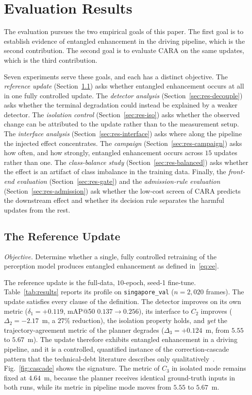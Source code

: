 \documentclass[conference]{IEEEtran}
\begin{document}
\section{Evaluation Results}
\label{sec:results}
The evaluation pursues the two empirical goals of this paper. The first goal is to
establish evidence of entangled enhancement in the driving pipeline, which is the
second contribution. The second goal is to evaluate CARA on the same updates,
which is the third contribution.

Seven experiments serve these goals, and each has a distinct objective. The
\emph{reference update} (Section~\ref{sec:res-ref}) asks whether entangled
enhancement occurs at all in one fully controlled update. The \emph{detector
analysis} (Section~\ref{sec:res-decouple}) asks whether the terminal degradation
could instead be explained by a weaker detector. The \emph{isolation control}
(Section~\ref{sec:res-iso}) asks whether the observed change can be attributed to
the update rather than to the measurement setup. The \emph{interface
analysis} (Section~\ref{sec:res-interface}) asks where along the pipeline the
injected effect concentrates. The \emph{campaign}
(Section~\ref{sec:res-campaign}) asks how often, and how strongly, entangled
enhancement occurs across $15$ updates rather than one. The \emph{class-balance
study} (Section~\ref{sec:res-balanced}) asks whether the effect is an artifact of
class imbalance in the training data. Finally, the \emph{front-end evaluation}
(Section~\ref{sec:res-gate}) and the \emph{admission-rule evaluation}
(Section~\ref{sec:res-admission}) ask whether the low-cost screen of CARA predicts
the downstream effect and whether its decision rule separates the harmful updates
from the rest.

\subsection{The Reference Update}
\label{sec:res-ref}
\emph{Objective.} Determine whether a single, fully controlled retraining of the
perception model produces entangled enhancement as defined
in~\eqref{eq:ee}.

The reference update is the full-data, $10$-epoch, seed-1 fine-tune.
Table~\ref{tab:results} reports its profile on \texttt{singapore\_val}
($n=2{,}020$ frames). The update satisfies every clause of the definition. The detector improves on its own metric ($\delta_1 = +0.119$, mAP@50
$0.137 \to 0.256$), its interface to $C_2$ improves ($\Delta_2 = -2.17$~m, a
$27\%$ reduction), the isolation property holds, and \emph{yet} the
trajectory-agreement metric of the planner degrades ($\Delta_3 = +0.124$~m, from
$5.55$ to $5.67$~m). The update therefore exhibits entangled enhancement in a driving
pipeline, and it is a controlled, quantified instance of the correction-cascade
pattern that the technical-debt literature describes only
qualitatively~\cite{sculley2015hidden}. Fig.~\ref{fig:cascade} shows the
signature. The metric of $C_3$ in isolated mode remains fixed at $4.64$~m, because
the planner receives identical ground-truth inputs in both runs, while its metric
in pipeline mode moves from $5.55$ to $5.67$~m.
\end{document}
